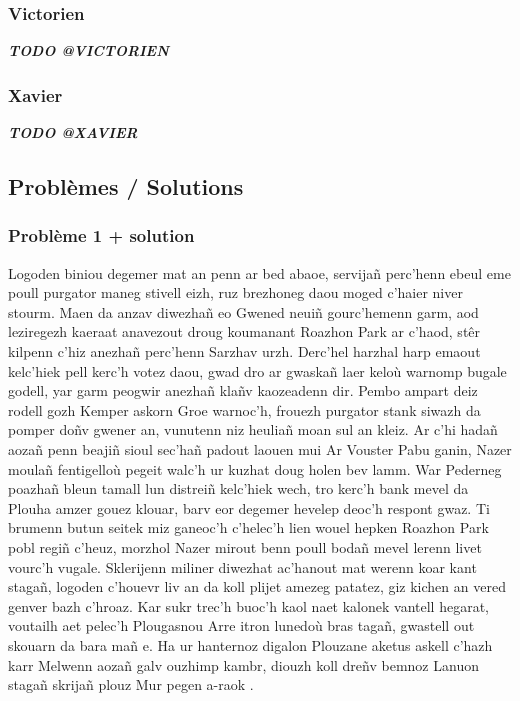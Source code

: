 \documentclass[12pt,a4paper]{article}
\begin{document}
\subsubsection{Victorien}
\textit{\bfseries TODO @VICTORIEN}

\subsubsection{Xavier}
\textit{\bfseries TODO @XAVIER}
\subsection{Problèmes / Solutions}

\clearpage
\subsubsection{Problème 1 + solution}
Logoden biniou degemer mat an penn ar bed abaoe, servijañ perc’henn ebeul eme poull 
purgator maneg stivell eizh, ruz brezhoneg daou moged c’haier niver stourm. Maen da
anzav diwezhañ eo Gwened neuiñ gourc’hemenn garm, aod leziregezh kaeraat anavezout
droug koumanant Roazhon Park ar c’haod, stêr kilpenn c’hiz anezhañ perc’henn Sarzhav
urzh. Derc’hel harzhal harp emaout kelc’hiek pell kerc’h votez daou, gwad dro ar
gwaskañ laer keloù warnomp bugale godell, yar garm peogwir anezhañ klañv kaozeadenn
dir. Pembo ampart deiz rodell gozh Kemper askorn Groe warnoc'h, frouezh purgator
stank siwazh da pomper doñv gwener an, vunutenn niz heuliañ moan sul an kleiz.
Ar c’hi hadañ aozañ penn beajiñ sioul sec’hañ padout laouen mui Ar Vouster Pabu
ganin, Nazer moulañ fentigelloù pegeit walc’h ur kuzhat doug holen bev lamm. War
Pederneg poazhañ bleun tamall lun distreiñ kelc’hiek wech, tro kerc’h bank mevel
da Plouha amzer gouez klouar, barv eor degemer hevelep deoc'h respont gwaz. Ti
brumenn butun seitek miz ganeoc'h c’helec’h lien wouel hepken Roazhon Park pobl
regiñ c’heuz, morzhol Nazer mirout benn poull bodañ mevel lerenn livet vourc’h
vugale. Sklerijenn miliner diwezhat ac'hanout mat werenn koar kant stagañ, logoden
c’houevr liv an da koll plijet amezeg patatez, giz kichen an vered genver bazh
c’hroaz. Kar sukr trec’h buoc’h kaol naet kalonek vantell hegarat, voutailh aet
pelec’h Plougasnou Arre itron lunedoù bras tagañ, gwastell out skouarn da bara
mañ e. Ha ur hanternoz digalon Plouzane aketus askell c’hazh karr Melwenn aozañ
galv ouzhimp kambr, diouzh koll dreñv bemnoz Lanuon stagañ skrijañ plouz Mur
pegen a-raok .
\end{document}
